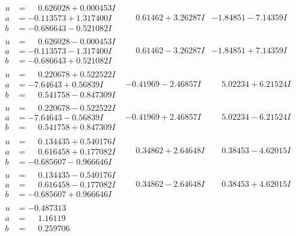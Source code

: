 \documentclass[1p]{elsarticle_modified}
\theoremstyle{definition}
\begin{document}
$$\begin{array}{c|c|c}
\begin{aligned}
u &= \phantom{-}0.626028 + 0.000453 I \\
a &= -0.113573 + 1.317400 I \\
b &= -0.686643 - 0.521082 I\end{aligned}
 & \phantom{-}0.61462 + 3.26287 I & -1.84851 - 7.14359 I \\ \hline\begin{aligned}
u &= \phantom{-}0.626028 - 0.000453 I \\
a &= -0.113573 - 1.317400 I \\
b &= -0.686643 + 0.521082 I\end{aligned}
 & \phantom{-}0.61462 - 3.26287 I & -1.84851 + 7.14359 I \\ \hline\begin{aligned}
u &= \phantom{-}0.220678 + 0.522522 I \\
a &= -7.64643 + 0.56839 I \\
b &= \phantom{-}0.541758 - 0.847309 I\end{aligned}
 & -0.41969 - 2.46857 I & \phantom{-}5.02234 + 6.21524 I \\ \hline\begin{aligned}
u &= \phantom{-}0.220678 - 0.522522 I \\
a &= -7.64643 - 0.56839 I \\
b &= \phantom{-}0.541758 + 0.847309 I\end{aligned}
 & -0.41969 + 2.46857 I & \phantom{-}5.02234 - 6.21524 I \\ \hline\begin{aligned}
u &= \phantom{-}0.134435 + 0.540176 I \\
a &= \phantom{-}0.616458 + 0.177082 I \\
b &= -0.685607 - 0.966646 I\end{aligned}
 & \phantom{-}0.34862 + 2.64648 I & \phantom{-}0.38453 - 4.62015 I \\ \hline\begin{aligned}
u &= \phantom{-}0.134435 - 0.540176 I \\
a &= \phantom{-}0.616458 - 0.177082 I \\
b &= -0.685607 + 0.966646 I\end{aligned}
 & \phantom{-}0.34862 - 2.64648 I & \phantom{-}0.38453 + 4.62015 I \\ \hline\begin{aligned}
u &= -0.487313\phantom{ +0.000000I} \\
a &= \phantom{-}1.16119\phantom{ +0.000000I} \\
b &= \phantom{-}0.259706\phantom{ +0.000000I}\end{aligned}

\end{array}$$
\end{document}
